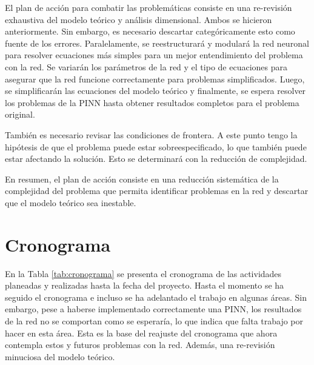 El plan de acción para combatir las problemáticas consiste en una re-revisión exhaustiva del modelo teórico y análisis dimensional. Ambos se hicieron anteriormente. Sin embargo, es necesario descartar categóricamente esto como fuente de los errores. Paralelamente, se reestructurará y modulará la red neuronal para resolver ecuaciones más simples para un mejor entendimiento del problema con la red. Se variarán los parámetros de la red y el tipo de ecuaciones para asegurar que la red funcione correctamente para problemas simplificados. Luego, se simplificarán las ecuaciones del modelo teórico y finalmente, se espera resolver los problemas de la PINN hasta obtener resultados completos para el problema original.

También es necesario revisar las condiciones de frontera. A este punto tengo la hipótesis de que el problema puede estar sobreespecificado, lo que también puede estar afectando la solución. Esto se determinará con la reducción de complejidad.

En resumen, el plan de acción consiste en una reducción sistemática de la complejidad del problema que permita identificar problemas en la red y descartar que el modelo teórico sea inestable. 
 
\section{Cronograma}

En la Tabla \ref{tab:cronograma} se presenta el cronograma de las actividades planeadas y realizadas hasta la fecha del proyecto. Hasta el momento se ha seguido el cronograma e incluso se ha adelantado el trabajo en algunas áreas. Sin embargo, pese a haberse implementado correctamente una PINN, los resultados de la red no se comportan como se esperaría, lo que indica  que falta trabajo por hacer en esta área. Esta es la base del reajuste del cronograma que ahora contempla estos y futuros problemas con la red. Además, una re-revisión minuciosa del modelo teórico. 

